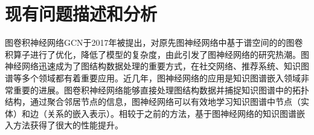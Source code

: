 








\section{现有问题描述和分析}

图卷积神经网络GCN于2017年被提出，对原先图神经网络中基于谱空间的的图卷积算子进行了优化，降低了模型的复杂度，由此引发了图神经网络的研究热潮。图神经网络迅速成为了图结构数据处理的重要方式，在社交网络、推荐系统、知识图谱等多个领域都有着重要应用。近几年，图神经网络的应用是知识图谱嵌入领域非常重要的进展。图卷积神经网络能够直接处理图结构数据并捕捉知识图谱中的拓扑结构，通过聚合邻居节点的信息，图神经网络可以有效地学习知识图谱中节点（实体）和边（关系的嵌入表示）。相较于之前的方法，基于图神经网络的知识图谱嵌入方法获得了很大的性能提升。

